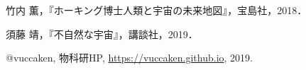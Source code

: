 \documentclass[10pt,b5paper,papersize,dvipdfmx]{jsbook}
\begin{document}
\newpage

\begin{thebibliography}{99}
  \item 竹内 薫，『ホーキング博士人類と宇宙の未来地図』，宝島社，2018．
  \item 須藤 靖，『不自然な宇宙』，講談社，2019．
  \item @vuccaken, 物科研HP, \url{https://vuccaken.github.io}, 2019.
\end{thebibliography}
\end{document}
